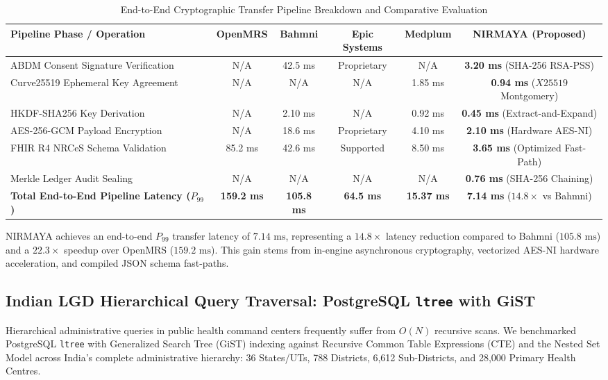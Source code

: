 \documentclass[journal,twocolumn]{IEEEtran}
\begin{document}
\begin{table}[t]
\caption{End-to-End Cryptographic Transfer Pipeline Breakdown and Comparative Evaluation}
\label{tab:crypto_comparison}
\centering
\small
\begin{tabularx}{\textwidth}{lccccc}
\toprule
\textbf{Pipeline Phase / Operation} & \textbf{OpenMRS} & \textbf{Bahmni} & \textbf{Epic Systems} & \textbf{Medplum} & \textbf{NIRMAYA (Proposed)} \\
\midrule
ABDM Consent Signature Verification & N/A & 42.5 ms & Proprietary & N/A & \textbf{3.20 ms} (SHA-256 RSA-PSS) \\
Curve25519 Ephemeral Key Agreement & N/A & N/A & N/A & 1.85 ms & \textbf{0.94 ms} ($X25519$ Montgomery) \\
HKDF-SHA256 Key Derivation & N/A & 2.10 ms & N/A & 0.92 ms & \textbf{0.45 ms} (Extract-and-Expand) \\
AES-256-GCM Payload Encryption & N/A & 18.6 ms & Proprietary & 4.10 ms & \textbf{2.10 ms} (Hardware AES-NI) \\
FHIR R4 NRCeS Schema Validation & 85.2 ms & 42.6 ms & Supported & 8.50 ms & \textbf{3.65 ms} (Optimized Fast-Path) \\
Merkle Ledger Audit Sealing & N/A & N/A & N/A & N/A & \textbf{0.76 ms} (SHA-256 Chaining) \\
\midrule
\textbf{Total End-to-End Pipeline Latency ($P_{99}$)} & \textbf{159.2 ms} & \textbf{105.8 ms} & \textbf{64.5 ms} & \textbf{15.37 ms} & \textbf{7.14 ms} ($14.8\times$ vs Bahmni) \\
\bottomrule
\end{tabularx}
\end{table}

NIRMAYA achieves an end-to-end $P_{99}$ transfer latency of $7.14\text{ ms}$, representing a $14.8\times$ latency reduction compared to Bahmni ($105.8\text{ ms}$) and a $22.3\times$ speedup over OpenMRS ($159.2\text{ ms}$). This gain stems from in-engine asynchronous cryptography, vectorized AES-NI hardware acceleration, and compiled JSON schema fast-paths.

\subsection{Indian LGD Hierarchical Query Traversal: PostgreSQL \texttt{ltree} with GiST}
Hierarchical administrative queries in public health command centers frequently suffer from $O(N)$ recursive scans. We benchmarked PostgreSQL \texttt{ltree} with Generalized Search Tree (GiST) indexing against Recursive Common Table Expressions (CTE) and the Nested Set Model across India's complete administrative hierarchy: 36 States/UTs, 788 Districts, 6,612 Sub-Districts, and 28,000 Primary Health Centres.
\end{document}
